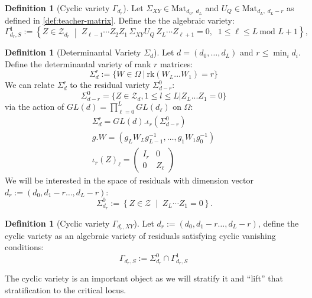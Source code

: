 \documentclass{article}
\theoremstyle{definition}
\newtheorem{definition}[theorem]{Definition}
\begin{document}
\begin{definition}[Cyclic variety $\Gamma_{d_r}$]
Let $\Sigma_{XY} \in \mathrm{Mat}_{d_0,\; d_L}$ and $U_Q \in \mathrm{Mat}_{d_L,\; d_L - r}$ as defined in \ref{def:teacher-matrix}. Define the the algebraic variety:
\[
\Gamma^1_{d_r,S}
:=
\left\{
Z \in \mathcal Z_{d_r}
\;\middle|\;
Z_{\ell-1}\cdots Z_2 Z_1 \,\Sigma_{XY} U_Q\, Z_L \cdots Z_{\ell+1} = 0,
\;\; 1 \le \ell \le L \ \text{mod } L+1
\right\},
\]
\end{definition}
\begin{definition}[Determinantal Variety $\Sigma_d$]\label{def:determinantal-variety} Let $d=(d_0,\dots,d_L)$ and $r\le \min_i d_i$. Define the determinantal variety of rank $r$ matrices:
\begin{equation*}
    \Sigma_{d}^r := \{W\in\Omega \ | \ \text{rk}(W_L...W_1) = r\}
\end{equation*}
We can relate $\Sigma_{d}^r$ to the residual variety $\Sigma_{d-r}^0$:
\begin{equation*}
    \Sigma_{d-r}^0 = \{Z\in\mathcal{Z}_d, 1\leq l \leq L| Z_L...Z_1 = 0\}
\end{equation*}
via the action of $GL(d) = \prod_{\ell=0}^L GL(d_{\ell})$ on $\Omega$:
\begin{align*}
    \Sigma_{d}^r = GL(d).\iota_r(\Sigma_{d-r}^0) \\
    g.W = (g_L W_L g_{L-1}^{-1}, \dots, g_1 W_1 g_0^{-1}) \\
    \iota_r(Z)_\ell = \begin{pmatrix} I_r & 0 \\ 0 & Z_\ell \end{pmatrix}
\end{align*}
We will be interested in the space of residuals with dimension vector $d_r:=(d_0, d_1-r\dots,d_L-r)$:
\[\
\Sigma^0_{d_r}
:=
\left\{
Z\in \mathcal Z
\;\middle|\;
Z_L\cdots Z_1=0
\right\}.
\]
\end{definition}
\begin{definition}[Cyclic variety $\Gamma_{d_r,XY}$]
Let $d_r:=(d_0, d_1-r\dots,d_L-r)$, define the cyclic variety as an algebraic variety of residuals satisfying  cyclic vanishing conditions:
\[
\Gamma_{d_r,S}:= \Sigma^0_{d_r}\cap\Gamma^1_{d_r,S}
\]
\end{definition}
\noindent
The cyclic variety is an important object as we will stratify it and ``lift'' that stratification to the critical locus. 
\end{document}
